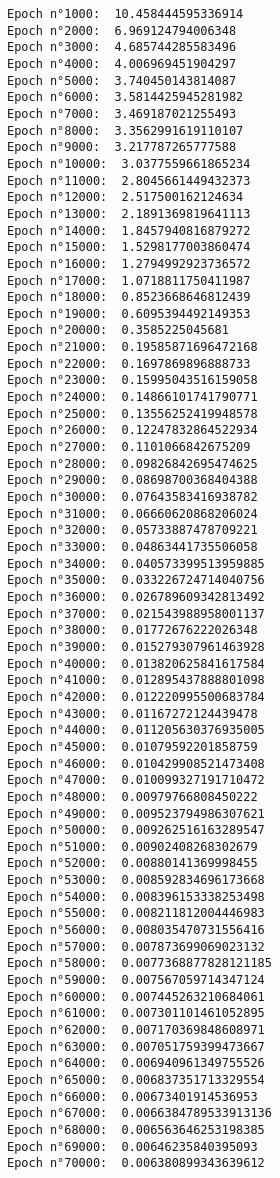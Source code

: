 \documentclass[11pt]{article}
\begin{document}
    \begin{Verbatim}[commandchars=\\\{\}]
Epoch n°1000:  10.458444595336914
Epoch n°2000:  6.969124794006348
Epoch n°3000:  4.685744285583496
Epoch n°4000:  4.006969451904297
Epoch n°5000:  3.740450143814087
Epoch n°6000:  3.5814425945281982
Epoch n°7000:  3.469187021255493
Epoch n°8000:  3.3562991619110107
Epoch n°9000:  3.217787265777588
Epoch n°10000:  3.0377559661865234
Epoch n°11000:  2.8045661449432373
Epoch n°12000:  2.517500162124634
Epoch n°13000:  2.1891369819641113
Epoch n°14000:  1.8457940816879272
Epoch n°15000:  1.5298177003860474
Epoch n°16000:  1.2794992923736572
Epoch n°17000:  1.0718811750411987
Epoch n°18000:  0.8523668646812439
Epoch n°19000:  0.6095394492149353
Epoch n°20000:  0.3585225045681
Epoch n°21000:  0.19585871696472168
Epoch n°22000:  0.1697869896888733
Epoch n°23000:  0.15995043516159058
Epoch n°24000:  0.14866101741790771
Epoch n°25000:  0.13556252419948578
Epoch n°26000:  0.12247832864522934
Epoch n°27000:  0.1101066842675209
Epoch n°28000:  0.09826842695474625
Epoch n°29000:  0.08698700368404388
Epoch n°30000:  0.07643583416938782
Epoch n°31000:  0.06660620868206024
Epoch n°32000:  0.05733887478709221
Epoch n°33000:  0.04863441735506058
Epoch n°34000:  0.040573399513959885
Epoch n°35000:  0.033226724714040756
Epoch n°36000:  0.026789609342813492
Epoch n°37000:  0.021543988958001137
Epoch n°38000:  0.01772676222026348
Epoch n°39000:  0.015279307961463928
Epoch n°40000:  0.013820625841617584
Epoch n°41000:  0.012895437888801098
Epoch n°42000:  0.012220995500683784
Epoch n°43000:  0.01167272124439478
Epoch n°44000:  0.011205630376935005
Epoch n°45000:  0.01079592201858759
Epoch n°46000:  0.010429908521473408
Epoch n°47000:  0.010099327191710472
Epoch n°48000:  0.00979766808450222
Epoch n°49000:  0.009523794986307621
Epoch n°50000:  0.009262516163289547
Epoch n°51000:  0.00902408268302679
Epoch n°52000:  0.00880141369998455
Epoch n°53000:  0.008592834696173668
Epoch n°54000:  0.008396153338253498
Epoch n°55000:  0.008211812004446983
Epoch n°56000:  0.008035470731556416
Epoch n°57000:  0.007873699069023132
Epoch n°58000:  0.0077368877828121185
Epoch n°59000:  0.007567059714347124
Epoch n°60000:  0.007445263210684061
Epoch n°61000:  0.007301101461052895
Epoch n°62000:  0.007170369848608971
Epoch n°63000:  0.007051759399473667
Epoch n°64000:  0.006940961349755526
Epoch n°65000:  0.006837351713329554
Epoch n°66000:  0.00673401914536953
Epoch n°67000:  0.0066384789533913136
Epoch n°68000:  0.006563646253198385
Epoch n°69000:  0.00646235840395093
Epoch n°70000:  0.006380899343639612

\end{Verbatim}
\end{document}
